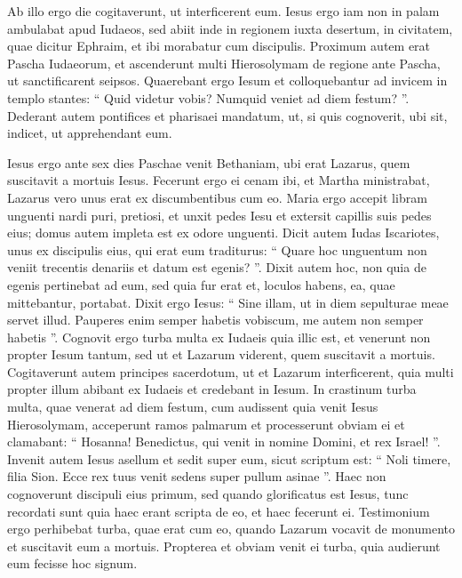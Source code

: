 \begin{biblechapter}
\begin{biblechapter}
\begin{biblechapter}
\begin{biblechapter}
\begin{biblechapter}
\begin{biblechapter}
\begin{biblechapter}
\begin{biblechapter}
\begin{biblechapter}
\begin{biblechapter}
\begin{biblechapter}
\verse Ab illo ergo die cogitaverunt, ut interficerent eum.
 \verse Iesus ergo iam non in palam ambulabat apud Iudaeos, sed abiit inde in regionem iuxta desertum, in civitatem, quae dicitur Ephraim, et ibi morabatur cum discipulis.
 \verse Proximum autem erat Pascha Iudaeorum, et ascenderunt multi Hierosolymam de regione ante Pascha, ut sanctificarent seipsos. 
\verse Quaerebant ergo Iesum et colloquebantur ad invicem in templo stantes: “ Quid videtur vobis? Numquid veniet ad diem festum? ”. 
\verse Dederant autem pontifices et pharisaei mandatum, ut, si quis cognoverit, ubi sit, indicet, ut apprehendant eum.
 
\begin{biblechapter}
\verse Iesus ergo ante sex dies Paschae venit Bethaniam, ubi erat Lazarus, quem suscitavit a mortuis Iesus. 
 \verse Fecerunt ergo ei cenam ibi, et Martha ministrabat, Lazarus vero unus erat ex discumbentibus cum eo. 
\verse Maria ergo accepit libram unguenti nardi puri, pretiosi, et unxit pedes Iesu et extersit capillis suis pedes eius; domus autem impleta est ex odore unguenti. 
\verse Dicit autem Iudas Iscariotes, unus ex discipulis eius, qui erat eum traditurus: 
\verse “ Quare hoc unguentum non veniit trecentis denariis et datum est egenis? ”. 
\verse Dixit autem hoc, non quia de egenis pertinebat ad eum, sed quia fur erat et, loculos habens, ea, quae mittebantur, portabat. 
\verse Dixit ergo Iesus: “ Sine illam, ut in diem sepulturae meae servet illud. 
\verse Pauperes enim semper habetis vobiscum, me autem non semper habetis ”.
 \verse Cognovit ergo turba multa ex Iudaeis quia illic est, et venerunt non propter Iesum tantum, sed ut et Lazarum viderent, quem suscitavit a mortuis. 
\verse Cogitaverunt autem principes sacerdotum, ut et Lazarum interficerent, 
\verse quia multi propter illum abibant ex Iudaeis et credebant in Iesum.
 \verse In crastinum turba multa, quae venerat ad diem festum, cum audissent quia venit Iesus Hierosolymam, 
\verse acceperunt ramos palmarum et processerunt obviam ei et clamabant:
 “ Hosanna!
 Benedictus, qui venit in nomine Domini, et rex Israel! ”.
 \verse Invenit autem Iesus asellum et sedit super eum, sicut scriptum est:
 \verse “ Noli timere, filia Sion.
 Ecce rex tuus venit
 sedens super pullum asinae ”.
 \verse Haec non cognoverunt discipuli eius primum, sed quando glorificatus est Iesus, tunc recordati sunt quia haec erant scripta de eo, et haec fecerunt ei. 
\verse Testimonium ergo perhibebat turba, quae erat cum eo, quando Lazarum vocavit de monumento et suscitavit eum a mortuis. 
\verse Propterea et obviam venit ei turba, quia audierunt eum fecisse hoc signum. 

\end{biblechapter}
\end{biblechapter}
\end{biblechapter}
\end{biblechapter}
\end{biblechapter}
\end{biblechapter}
\end{biblechapter}
\end{biblechapter}
\end{biblechapter}
\end{biblechapter}
\end{biblechapter}
\end{biblechapter}
